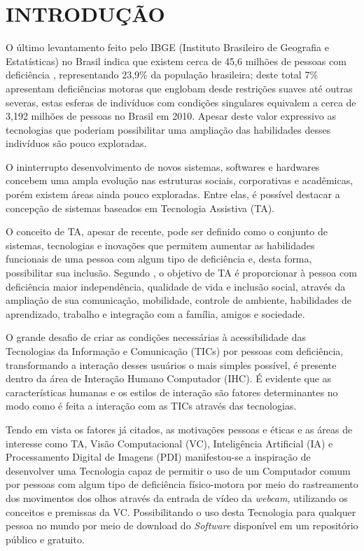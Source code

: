 \chapter{INTRODUÇÃO}\label{CAP:introducao}
O último levantamento feito pelo IBGE (Instituto Brasileiro de Geografia e Estatísticas) no Brasil indica que existem cerca de 45,6 milhões de pessoas com deficiência , representando 23,9\% da população brasileira; deste total 7\% apresentam deficiências motoras que englobam desde restrições suaves até outras severas, estas esferas de indivíduos com condições singulares equivalem a cerca de 3,192 milhões de pessoas no Brasil em 2010. Apesar deste valor expressivo as tecnologias que poderiam possibilitar uma ampliação das habilidades desses indivíduos são pouco exploradas.

O ininterrupto desenvolvimento de novos sistemas, softwares e hardwares concebem uma ampla evolução nas estruturas sociais, corporativas e acadêmicas, porém existem áreas ainda pouco exploradas. Entre elas, é possível destacar a concepção de sistemas baseados em Tecnologia Assistiva (TA).

O conceito de TA, apesar de recente, pode ser definido como o conjunto de sistemas, tecnologias e inovações que permitem aumentar as habilidades funcionais de uma pessoa com algum tipo de deficiência e, desta forma, possibilitar sua inclusão. Segundo , o objetivo de TA é proporcionar à pessoa com deficiência maior independência, qualidade de vida e inclusão social, através da ampliação de sua comunicação, mobilidade, controle de ambiente, habilidades de aprendizado, trabalho e integração com a família, amigos e sociedade.

O grande desafio de criar as condições necessárias à acessibilidade das Tecnologias da Informação e Comunicação (TICs) por pessoas com deficiência, transformando a interação desses usuários o mais simples possível, é presente dentro da área de Interação Humano Computador (IHC). É evidente que as características humanas e os estilos de interação são fatores determinantes no modo como é feita a interação com as TICs através das tecnologias.

Tendo em vista os fatores já citados, as motivações pessoas e éticas e as áreas de interesse como TA, Visão Computacional (VC), Inteligência Artificial (IA) e Processamento Digital de Imagens (PDI) manifestou-se a inspiração de desenvolver uma Tecnologia capaz de permitir o uso de um Computador comum por pessoas com algum tipo de deficiência físico-motora por meio do rastreamento dos movimentos dos olhos através da entrada de vídeo da \textit{webcam}, utilizando os conceitos e premissas da VC. Possibilitando o uso desta Tecnologia para qualquer pessoa no mundo por meio de download do \textit{Software} disponível em um repositório público e gratuito.

